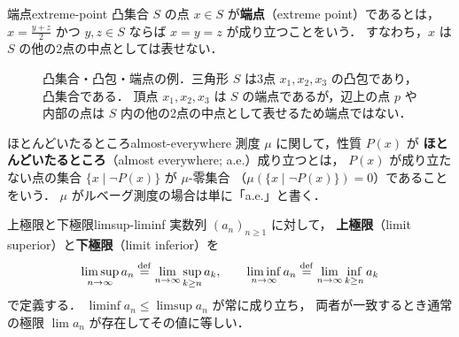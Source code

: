 \begin{definition}{端点}{extreme-point}
  凸集合 $S$ の点 $x \in S$ が\textbf{端点}（extreme point）であるとは，
  $x = \frac{y + z}{2}$ かつ $y, z \in S$ ならば $x = y = z$ が成り立つことをいう．
  すなわち，$x$ は $S$ の他の2点の中点としては表せない．
\end{definition}

\begin{figure}[htbp]
  \centering
  \caption{凸集合・凸包・端点の例．三角形 $S$ は3点 $x_1, x_2, x_3$ の凸包であり，凸集合である．
  頂点 $x_1, x_2, x_3$ は $S$ の端点であるが，辺上の点 $p$ や内部の点は $S$ 内の他の2点の中点として表せるため端点ではない．}
  \label{fig:convex-hull-extreme}
\end{figure}

\begin{definition}{ほとんどいたるところ}{almost-everywhere}
  測度 $\mu$ に関して，性質 $P(x)$ が
  \textbf{ほとんどいたるところ}（almost everywhere; a.e.）成り立つとは，
  $P(x)$ が成り立たない点の集合 $\{x \mid \lnot P(x)\}$ が $\mu$-零集合
  （$\mu(\{x \mid \lnot P(x)\}) = 0$）であることをいう．
  $\mu$ がルベーグ測度の場合は単に「a.e.」と書く．
\end{definition}

\begin{definition}{上極限と下極限}{limsup-liminf}
  実数列 $(a_n)_{n \geq 1}$ に対して，
  \textbf{上極限}（limit superior）と\textbf{下極限}（limit inferior）を
  \[
    \limsup_{n \to \infty} a_n \overset{\mathrm{def}}{=} \lim_{n \to \infty} \sup_{k \geq n} a_k, \qquad
    \liminf_{n \to \infty} a_n \overset{\mathrm{def}}{=} \lim_{n \to \infty} \inf_{k \geq n} a_k
  \]
  で定義する．
  $\liminf a_n \leq \limsup a_n$ が常に成り立ち，
  両者が一致するとき通常の極限 $\lim a_n$ が存在してその値に等しい．
\end{definition}

